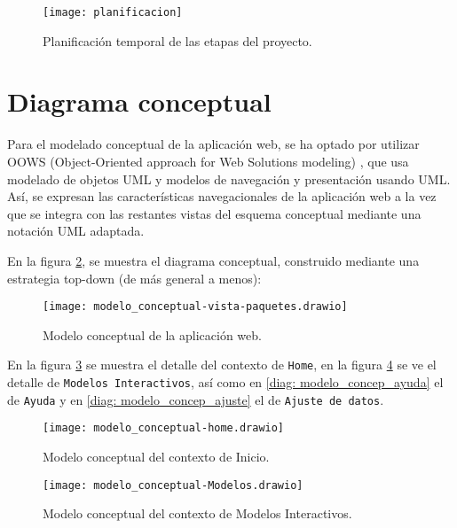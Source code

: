 \begin{figure}[!h]
\begin{center}
\caption{Planificación temporal de las etapas del proyecto.}
\label{fig: planificacion}
\texttt{[image: planificacion]}
\end{center}
\end{figure}


\section{Diagrama conceptual}

Para el modelado conceptual de la aplicación web, se ha optado por utilizar OOWS (Object-Oriented approach for Web Solutions modeling) \cite{pastorobject}, que usa modelado de objetos UML y modelos de navegación y presentación usando UML. Así, se expresan las características navegacionales de la aplicación web a la vez que se integra con las restantes vistas del esquema conceptual mediante una notación UML adaptada.

En la figura \ref{diag: modelo_concep}, se muestra el diagrama conceptual, construido mediante una estrategia top-down (de más general a menos):

\begin{figure}[!h]
\begin{center}
\caption{Modelo conceptual de la aplicación web.}
\label{diag: modelo_concep}
\texttt{[image: modelo\_conceptual-vista-paquetes.drawio]}
\end{center}
\end{figure}

En la figura \ref{diag: modelo_concep_home} se muestra el detalle del contexto de \verb|Home|, en la figura \ref{diag: modelo_concep_modelos} se ve el detalle de \verb|Modelos Interactivos|, así como en \ref{diag: modelo_concep_ayuda} el de \verb|Ayuda| y en \ref{diag: modelo_concep_ajuste} el de \verb|Ajuste de datos|.

\begin{figure}[!h]
\begin{center}
\caption{Modelo conceptual del contexto de Inicio.}
\label{diag: modelo_concep_home}
\texttt{[image: modelo\_conceptual-home.drawio]}
\end{center}
\end{figure}

\begin{figure}[!h]
\begin{center}
\caption{Modelo conceptual del contexto de Modelos Interactivos.}
\label{diag: modelo_concep_modelos}
\texttt{[image: modelo\_conceptual-Modelos.drawio]}
\end{center}
\end{figure}

